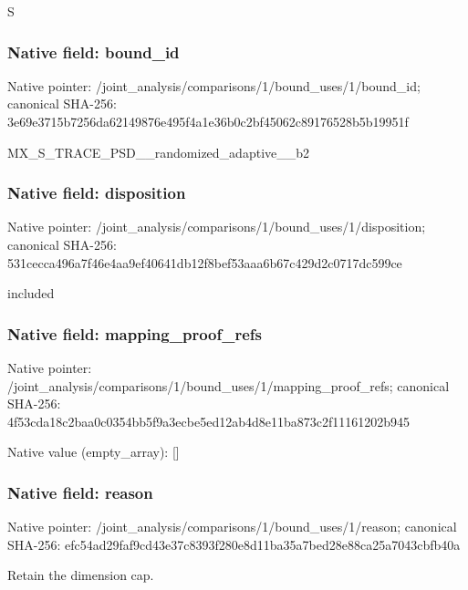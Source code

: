 \documentclass[10pt,a4paper]{article}
\begin{document}
\begingroup\raggedright\sloppy S\par\endgroup

\subsubsection{Native field: bound\_\allowbreak{}id}
Native pointer: /joint\_\allowbreak{}analysis/comparisons/1/bound\_\allowbreak{}uses/1/bound\_\allowbreak{}id; canonical SHA-256: 3e69e3715b7256da62149876e495f4a1e36b0c2bf45062c89176528b5b19951f

\begingroup\raggedright\sloppy MX\_\allowbreak{}S\_\allowbreak{}TRACE\_\allowbreak{}PSD\_\allowbreak{}\_\allowbreak{}randomized\_\allowbreak{}adaptive\_\allowbreak{}\_\allowbreak{}b2\par\endgroup

\subsubsection{Native field: disposition}
Native pointer: /joint\_\allowbreak{}analysis/comparisons/1/bound\_\allowbreak{}uses/1/disposition; canonical SHA-256: 531cecca496a7f46e4aa9ef40641db12f8bef53aaa6b67c429d2c0717dc599ce

\begingroup\raggedright\sloppy included\par\endgroup

\subsubsection{Native field: mapping\_\allowbreak{}proof\_\allowbreak{}refs}
Native pointer: /joint\_\allowbreak{}analysis/comparisons/1/bound\_\allowbreak{}uses/1/mapping\_\allowbreak{}proof\_\allowbreak{}refs; canonical SHA-256: 4f53cda18c2baa0c0354bb5f9a3ecbe5ed12ab4d8e11ba873c2f11161202b945

Native value (empty\_\allowbreak{}array): []

\subsubsection{Native field: reason}
Native pointer: /joint\_\allowbreak{}analysis/comparisons/1/bound\_\allowbreak{}uses/1/reason; canonical SHA-256: efc54ad29faf9cd43e37c8393f280e8d11ba35a7bed28e88ca25a7043cbfb40a

\begingroup\raggedright\sloppy Retain the dimension cap.\par\endgroup
\end{document}
